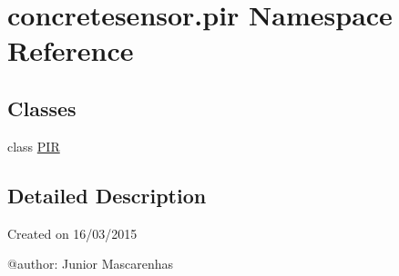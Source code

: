 \hypertarget{namespaceconcretesensor_1_1pir}{}\section{concretesensor.\+pir Namespace Reference}
\label{namespaceconcretesensor_1_1pir}
\subsection*{Classes}
\begin{DoxyCompactItemize}
\item 
class \hyperlink{classconcretesensor_1_1pir_1_1PIR}{P\+I\+R}
\end{DoxyCompactItemize}


\subsection{Detailed Description}
\begin{DoxyVerb}Created on 16/03/2015

@author: Junior Mascarenhas
\end{DoxyVerb}
 